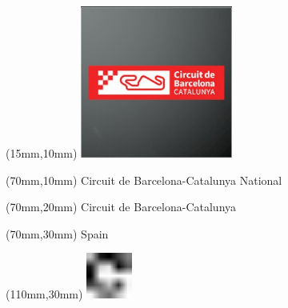 \null\newpage
\begin{textblock*}{50mm}(15mm,10mm)%
\includegraphics[width=50mm]{LG/2015-05-20_00078.png}
\end{textblock*}
\begin{textblock*}{130mm}(70mm,10mm)%
{\fontsize{20}{20}\selectfont Circuit de Barcelona-Catalunya National}\\
\end{textblock*}
\begin{textblock*}{120mm}(70mm,20mm)%
{\fontsize{16}{16}\selectfont Circuit de Barcelona-Catalunya}\\
\end{textblock*}
\begin{textblock*}{120mm}(70mm,30mm)%
{\fontsize{12}{12}\selectfont Spain}
\end{textblock*}
\begin{textblock*}{30mm}(110mm,30mm)%
\centering
\includegraphics[height=15mm]{icons/fa-rotate-right.pdf}
\end{textblock*}
